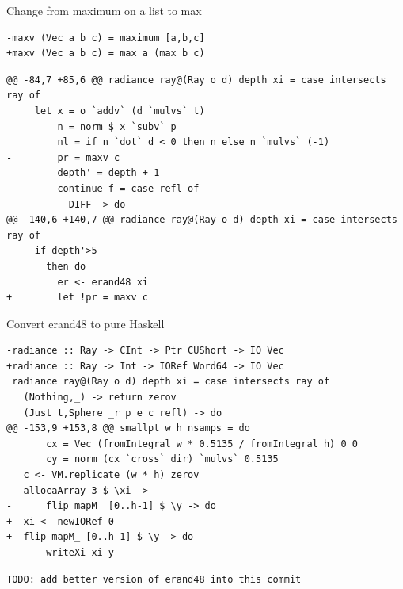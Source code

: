 \documentclass[8pt]{beamer}
\begin{document}
\begin{frame}[fragile]{Change from maximum on a list to max}
\begin{verbatim}
-maxv (Vec a b c) = maximum [a,b,c]
+maxv (Vec a b c) = max a (max b c)
\end{verbatim}

\begin{verbatim}
@@ -84,7 +85,6 @@ radiance ray@(Ray o d) depth xi = case intersects ray of
     let x = o `addv` (d `mulvs` t)
         n = norm $ x `subv` p
         nl = if n `dot` d < 0 then n else n `mulvs` (-1)
-        pr = maxv c
         depth' = depth + 1
         continue f = case refl of
           DIFF -> do
@@ -140,6 +140,7 @@ radiance ray@(Ray o d) depth xi = case intersects ray of
     if depth'>5
       then do
         er <- erand48 xi
+        let !pr = maxv c
\end{verbatim}

\end{frame}

\begin{frame}[fragile]{Convert erand48 to pure Haskell}
\begin{verbatim}
-radiance :: Ray -> CInt -> Ptr CUShort -> IO Vec
+radiance :: Ray -> Int -> IORef Word64 -> IO Vec
 radiance ray@(Ray o d) depth xi = case intersects ray of
   (Nothing,_) -> return zerov
   (Just t,Sphere _r p e c refl) -> do
@@ -153,9 +153,8 @@ smallpt w h nsamps = do
       cx = Vec (fromIntegral w * 0.5135 / fromIntegral h) 0 0
       cy = norm (cx `cross` dir) `mulvs` 0.5135
   c <- VM.replicate (w * h) zerov
-  allocaArray 3 $ \xi ->
-      flip mapM_ [0..h-1] $ \y -> do
+  xi <- newIORef 0
+  flip mapM_ [0..h-1] $ \y -> do
       writeXi xi y
\end{verbatim}

\begin{verbatim}
TODO: add better version of erand48 into this commit
\end{verbatim}
\end{frame}
\end{document}
